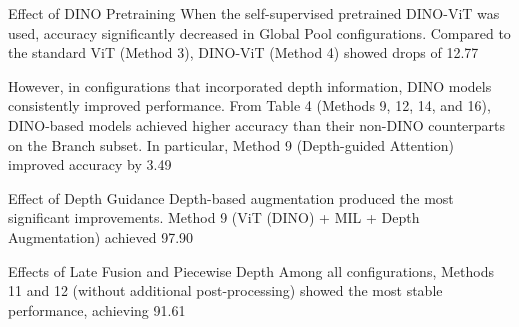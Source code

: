 \documentclass{article}
\begin{document}
Effect of DINO Pretraining
When the self-supervised pretrained DINO-ViT was used, accuracy significantly decreased in Global Pool configurations. Compared to the standard ViT (Method 3), DINO-ViT (Method 4) showed drops of 12.77%

However, in configurations that incorporated depth information, DINO models consistently improved performance. From Table 4 (Methods 9, 12, 14, and 16), DINO-based models achieved higher accuracy than their non-DINO counterparts on the Branch subset. In particular, Method 9 (Depth-guided Attention) improved accuracy by 3.49%

Effect of Depth Guidance
Depth-based augmentation produced the most significant improvements. Method 9 (ViT (DINO) + MIL + Depth Augmentation) achieved 97.90%

Effects of Late Fusion and Piecewise Depth
Among all configurations, Methods 11 and 12 (without additional post-processing) showed the most stable performance, achieving 91.61%
\end{document}
